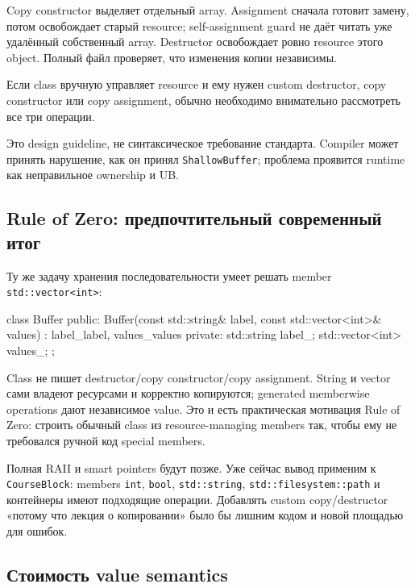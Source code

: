Copy constructor выделяет отдельный array. Assignment сначала готовит замену,
потом освобождает старый resource; self-assignment guard не даёт читать уже
удалённый собственный array. Destructor освобождает ровно resource этого
object. Полный файл проверяет, что изменения копии независимы.

\begin{definition}
Если class вручную управляет resource и ему нужен custom destructor, copy
constructor или copy assignment, обычно необходимо внимательно рассмотреть
все три операции.
\end{definition}

Это design guideline, не синтаксическое требование стандарта. Compiler может
принять нарушение, как он принял \texttt{ShallowBuffer}; проблема проявится
runtime как неправильное ownership и UB.

\subsection{Rule of Zero: предпочтительный современный итог}

Ту же задачу хранения последовательности умеет решать member
\texttt{std::vector<int>}:

\begin{cppcode}
class Buffer {
public:
    Buffer(const std::string& label, const std::vector<int>& values)
        : label_{label}, values_{values} {}
private:
    std::string label_;
    std::vector<int> values_;
};
\end{cppcode}

Class не пишет destructor/copy constructor/copy assignment. String и vector
сами владеют ресурсами и корректно копируются; generated memberwise operations
дают независимое value. Это и есть практическая мотивация Rule of Zero:
строить обычный class из resource-managing members так, чтобы ему не требовался
ручной код special members.

Полная RAII и smart pointers будут позже. Уже сейчас вывод применим к
\texttt{CourseBlock}: members \texttt{int}, \texttt{bool},
\texttt{std::string}, \texttt{std::filesystem::path} и контейнеры имеют
подходящие операции. Добавлять custom copy/destructor «потому что лекция о
копировании» было бы лишним кодом и новой площадью для ошибок.

\subsection{Стоимость value semantics}

